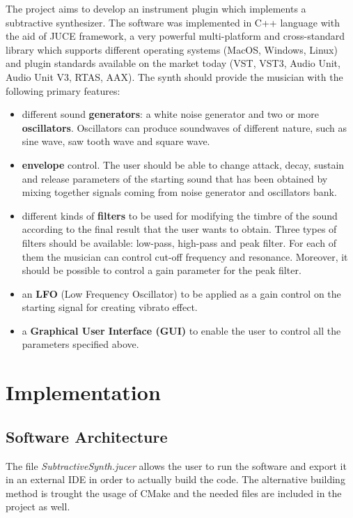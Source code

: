 \documentclass{article}
\begin{document}
The project aims to develop an instrument plugin which implements a subtractive synthesizer. The software was implemented in C++ language with the aid of JUCE framework, a very powerful multi-platform and cross-standard library which supports different operating systems (MacOS, Windows, Linux) and plugin standards available on the market today (VST, VST3, Audio Unit, Audio Unit V3, RTAS, AAX).
The synth should provide the musician with the following primary features:
\begin{itemize}
    \item different sound \textbf{generators}: a white noise generator and two or more \textbf{oscillators}. Oscillators can produce soundwaves of different nature, such as sine wave, saw tooth wave and square wave.
    \item \textbf{envelope} control. The user should be able to change attack, decay, sustain and release parameters of the starting sound that has been obtained by mixing together signals coming from noise generator and oscillators bank.
    \item different kinds of \textbf{filters} to be used for modifying the timbre of the sound according to the final result that the user wants to obtain. Three types of filters should be available: low-pass, high-pass and peak filter. For each of them the musician can control cut-off frequency and resonance. Moreover, it should be possible to control a gain parameter for the peak filter.
    \item an \textbf{LFO} (Low Frequency Oscillator) to be applied as a gain control on the starting signal for creating vibrato effect.
    \item a \textbf{Graphical User Interface (GUI)} to enable the user to control all the parameters specified above.
\end{itemize}
\section{Implementation}

\subsection{Software Architecture}

The file \textit{SubtractiveSynth.jucer} allows the user to run the software and export it in an external IDE in order to actually build the code. The alternative building method is trought the usage of CMake and the needed files are included in the project as well.
\end{document}
